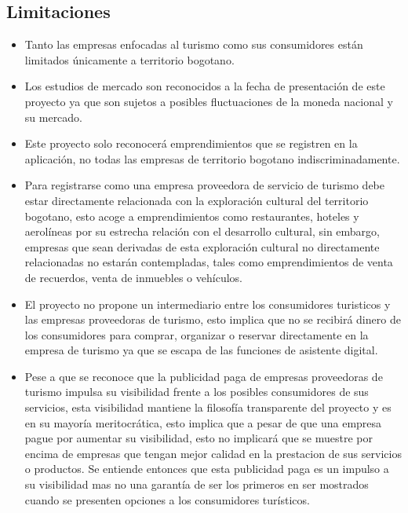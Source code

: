 \subsection{Limitaciones }
\begin{itemize}
    \item  Tanto las empresas enfocadas al turismo como sus consumidores están limitados únicamente a territorio bogotano.
    \item Los estudios de mercado son reconocidos a la fecha de presentación de este proyecto ya que son sujetos a posibles fluctuaciones de la moneda nacional y su mercado. 
    \item Este proyecto solo reconocerá emprendimientos que se registren en la aplicación, no todas las empresas de territorio bogotano indiscriminadamente. 
    \item Para registrarse como una empresa proveedora de servicio de turismo debe estar directamente relacionada con la exploración cultural del territorio bogotano, esto acoge a emprendimientos como restaurantes, hoteles y aerolíneas por su estrecha relación con el desarrollo cultural, sin embargo, empresas que sean derivadas de esta exploración cultural no directamente relacionadas no estarán contempladas, tales como emprendimientos de venta de recuerdos, venta de inmuebles o vehículos. 
    \item El proyecto no propone un intermediario entre los consumidores turisticos y las empresas proveedoras de turismo, esto implica que no se recibirá dinero de los consumidores para comprar, organizar o reservar directamente en la empresa de turismo ya que se escapa de las funciones de asistente digital. 
    \item Pese a que se reconoce que la publicidad paga de empresas proveedoras de turismo impulsa su visibilidad frente a los posibles consumidores de sus servicios, esta visibilidad mantiene la filosofía transparente del proyecto y es en su mayoría meritocrática, esto implica que a pesar de que una empresa pague por aumentar su visibilidad, esto no implicará que se muestre por encima de empresas que tengan mejor calidad en la prestacion de sus servicios o productos. Se entiende entonces que esta publicidad paga es un impulso a su visibilidad mas no una garantía de ser los primeros en ser mostrados cuando se presenten opciones a los consumidores turísticos. 





\end{itemize}

